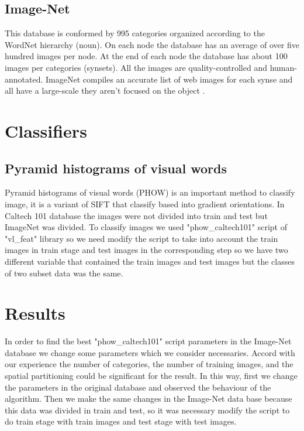 \documentclass[10pt,twocolumn,letterpaper]{article}
\begin{document}
\subsection{Image-Net}

This database is conformed by 995 categories organized according to the WordNet hierarchy (noun). On each node the database has an average of over five hundred images per node. At the end of each node the database has about 100 images per categories (synsets).   All the images are quality-controlled and human-annotated. ImageNet compiles an accurate list of web images for each synse and all have a large-scale they aren't focused on the object \cite{2}.

\section{Classifiers}

\subsection{Pyramid histograms of visual words}
Pyramid histograms of visual words (PHOW) is an important method to classify image, it is a variant of SIFT that classify based into gradient orientations. In Caltech 101 database the images were not divided into train and test but ImageNet was divided. To classify images we used "phow\_caltech101" script of "vl\_feat" library so we need modify the script to take into account the train images in train stage and test images in the corresponding step so we have two different variable that contained the train images and test images but the classes of two subset data was the same. 


\section{Results}
In order to find the best "phow\_caltech101" script parameters  in the Image-Net database we change some parameters which we consider necessaries. Accord with our experience the number of categories, the number of training images, and the spatial partitioning could be significant for the result. In this way, first we change the parameters in the original database and observed the behaviour of the algorithm.  Then we make the same changes in the Image-Net data base because this data was divided in train and test, so it was necessary modify the script to do train stage with train images and test stage with test images.  
\end{document}
